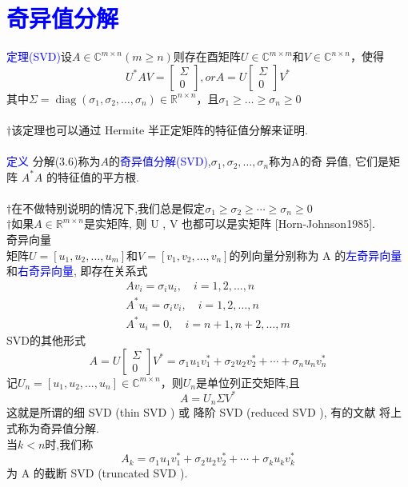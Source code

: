 \documentclass[12pt,a4paper]{article}
\begin{document}
\section{\textcolor{blue}{奇异值分解}}
\textcolor{blue}{定理(SVD)}设$A \in \mathbb{C}^{m \times n}(m \geq n)$则存在酉矩阵$U \in \mathbb{C}^{m \times m}$和$V \in \mathbb{C}^{n \times n}$，使得
\begin{equation}
U^{*} A V=\left[\begin{array}{l}{\Sigma} \\ {0}\end{array}\right],orA=U\left[\begin{array}{l}{\Sigma} \\ {0}\end{array}\right] V^{*}
\end {equation}
其中$\Sigma=\operatorname{diag}\left(\sigma_{1}, \sigma_{2}, \ldots, \sigma_{n}\right) \in \mathbb{R}^{n \times n}$，且$\sigma_{1} \geq \ldots \geq \sigma_{n} \geq 0$\\
\\
$\dagger$该定理也可以通过 Hermite 半正定矩阵的特征值分解来证明.\\
\\
\textcolor{blue}{定义} 分解(3.6)称为$A$的\textcolor{blue}{奇异值分解(SVD)},$\sigma_{1}, \sigma_{2}, \dots, \sigma_{n}$称为A的奇 异值, 它们是矩阵 $A^{*}A$ 的特征值的平方根.\\
\\
$\dagger$在不做特别说明的情况下,我们总是假定$\sigma_{1} \geq \sigma_{2} \geq \cdots \geq \sigma_{n} \geq 0$\\
$\dagger$如果$A \in \mathbb{R}^{m \times n}$是实矩阵, 则 U , V 也都可以是实矩阵 [Horn-Johnson1985].\\
 
 \noindent 奇异向量\\
 矩阵$U=\left[u_{1}, u_{2}, \ldots, u_{m}\right]$和$V=\left[v_{1}, v_{2}, \ldots, v_{n}\right]$的列向量分别称为 A 的\textcolor{blue}{左奇异向量}和\textcolor{blue}{右奇异向量}, 即存在关系式
 $$
\begin{array}{l}{A v_{i}=\sigma_{i} u_{i}, \quad i=1,2, \ldots, n} \\ {A^{*} u_{i}=\sigma_{i} v_{i}, \quad i=1,2, \ldots, n} \\ {A^{*} u_{i}=0, \quad i=n+1, n+2, \ldots, m}\end{array}
$$
 SVD的其他形式\\
 $$
A=U\left[\begin{array}{l}{\Sigma} \\ {0}\end{array}\right] V^{*}=\sigma_{1} u_{1} v_{1}^{*}+\sigma_{2} u_{2} v_{2}^{*}+\cdots+\sigma_{n} u_{n} v_{n}^{*}
$$
记$U_{n}=\left[u_{1}, u_{2}, \ldots, u_{n}\right] \in \mathbb{C}^{m \times n}$，则$U_{n}$是单位列正交矩阵,且
\begin{equation}
A=U_{n} \Sigma V^{*}
\end{equation}
这就是所谓的细 SVD (thin SVD ) 或 降阶 SVD (reduced SVD ), 有的文献 将上式称为奇异值分解.\\
当$k < n$时,我们称
$$
A_{k}=\sigma_{1} u_{1} v_{1}^{*}+\sigma_{2} u_{2} v_{2}^{*}+\cdots+\sigma_{k} u_{k} v_{k}^{*}
$$
为 A 的截断 SVD (truncated SVD ).\\
\end{document}
